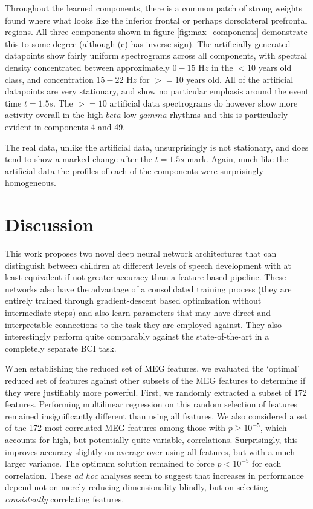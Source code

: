 \documentclass[utf8]{frontiersSCNS} %
\begin{document}
Throughout the learned components, there is a common patch of strong weights found where what looks like the inferior frontal or perhaps dorsolateral prefrontal regions. All three components shown in figure \ref{fig:max_components} demonstrate this to some degree (although (c) has inverse sign). The artificially generated datapoints show fairly uniform spectrograms across all components, with spectral density concentrated between approximately $0-15$ H$z$ in the $<10$ years old class, and concentration $15-22$ H$z$ for $>=10$ years old. All of the artificial datapoints are very stationary, and show no particular emphasis around the event time $t=1.5s$. The $>=10$ artificial data spectrograms do however show more activity overall in the high $beta$ low $gamma$ rhythms and this is particularly evident in components 4 and 49.

The real data, unlike the artificial data, unsurprisingly is not stationary, and does tend to show a marked change after the $t=1.5s$ mark. Again, much like the artificial data the profiles of each of the components were surprisingly homogeneous.

\section{Discussion}

This work proposes two novel deep neural network architectures that can distinguish between children at different levels of speech development with at least equivalent if not greater accuracy than a feature based-pipeline. These networks also have the advantage of a consolidated training process (they are entirely trained through gradient-descent based optimization without intermediate steps) and also learn parameters that may have direct and interpretable connections to the task they are employed against. They also interestingly perform quite comparably against the state-of-the-art in a completely separate BCI task. 

When establishing the reduced set of MEG features, we evaluated the `optimal' reduced set of features against other subsets of the MEG features to determine if they were justifiably more powerful. First, we randomly extracted a subset of 172 features. Performing multilinear regression on this random selection of features remained insignificantly different than using all features. We also considered a set of the 172 most correlated MEG features among those with $p \geq 10^{-5}$, which accounts for high, but potentially quite variable, correlations. Surprisingly, this improves accuracy slightly on average over using all features, but with a much larger variance. The optimum solution remained to force $p<10^{-5}$ for each correlation. These {\em ad hoc} analyses seem to suggest that increases in performance depend not on merely reducing dimensionality blindly, but on selecting {\em consistently} correlating features.
\end{document}

